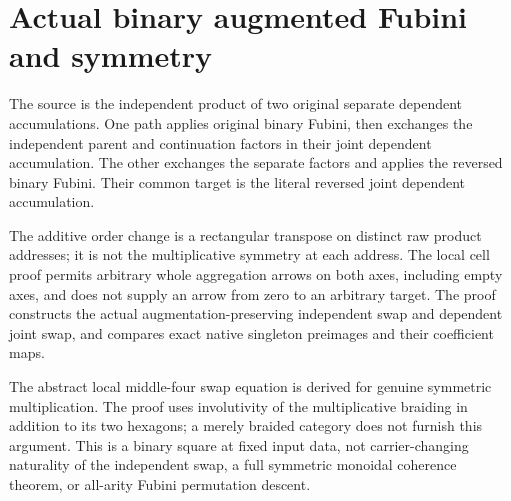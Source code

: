 \documentclass{article}
\begin{document}
\section*{Actual binary augmented Fubini and symmetry}
The source is the independent product of two original separate
dependent accumulations. One path applies original binary Fubini,
then exchanges the independent parent and continuation factors
in their joint dependent accumulation. The other exchanges the
separate factors and applies the reversed binary Fubini. Their
common target is the literal reversed joint dependent accumulation.

The additive order change is a rectangular transpose on distinct
raw product addresses; it is not the multiplicative symmetry at
each address. The local cell proof permits arbitrary whole
aggregation arrows on both axes, including empty axes, and does
not supply an arrow from zero to an arbitrary target. The proof
constructs the actual augmentation-preserving independent swap
and dependent joint swap, and compares exact native singleton
preimages and their coefficient maps.

The abstract local middle-four swap equation is derived for
genuine symmetric multiplication. The proof uses involutivity
of the multiplicative braiding in addition to its two hexagons;
a merely braided category does not furnish this argument.
This is a binary square at fixed input data, not carrier-changing
naturality of the independent swap, a full symmetric monoidal
coherence theorem, or all-arity Fubini permutation descent.
\end{document}
